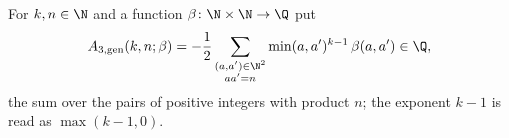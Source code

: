 For $k,n\in\N$ and a function $\beta\colon\N\times\N\to\Q$ put
\[
  A_{3,\mathrm{gen}}(k,n;\beta)=-\frac12\sum_{\substack{(a,a')\in\N^2\\ aa'=n}}\min(a,a')^{k-1}\,\beta(a,a')\in\Q,
\]
the sum over the pairs of positive integers with product $n$; the exponent $k-1$ is read as $\max(k-1,0)$.
